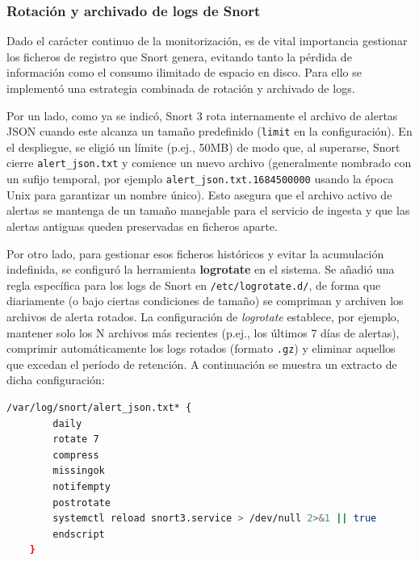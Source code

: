 \documentclass[11pt,a4paper,twoside]{report}
\begin{document}
\subsubsection{Rotación y archivado de logs de Snort}

Dado el carácter continuo de la monitorización, es de vital importancia gestionar los ficheros de registro que Snort genera, evitando tanto la pérdida de información como el consumo ilimitado de espacio en disco. Para ello se implementó una estrategia combinada de rotación y archivado de logs.\newline

Por un lado, como ya se indicó, Snort 3 rota internamente el archivo de alertas JSON cuando este alcanza un tamaño predefinido (\texttt{limit} en la configuración). En el despliegue, se eligió un límite (p.ej., 50MB) de modo que, al superarse, Snort cierre \texttt{alert\_json.txt} y comience un nuevo archivo (generalmente nombrado con un sufijo temporal, por ejemplo \texttt{alert\_json.txt.1684500000} usando la época Unix para garantizar un nombre único). Esto asegura que el archivo activo de alertas se mantenga de un tamaño manejable para el servicio de ingesta y que las alertas antiguas queden preservadas en ficheros aparte.\newline

Por otro lado, para gestionar esos ficheros históricos y evitar la acumulación indefinida, se configuró la herramienta \textbf{logrotate} en el sistema. Se añadió una regla específica para los logs de Snort en \texttt{/etc/logrotate.d/}, de forma que diariamente (o bajo ciertas condiciones de tamaño) se compriman y archiven los archivos de alerta rotados. La configuración de \textit{logrotate} establece, por ejemplo, mantener solo los N archivos más recientes (p.ej., los últimos 7 días de alertas), comprimir automáticamente los logs rotados (formato \texttt{.gz}) y eliminar aquellos que excedan el período de retención. A continuación se muestra un extracto de dicha configuración:

\begin{lstlisting}[language=bash, caption={Regla de logrotate para los logs de Snort}, label={lst:logrotate}]
	/var/log/snort/alert_json.txt* {
		daily
		rotate 7
		compress
		missingok
		notifempty
		postrotate
		systemctl reload snort3.service > /dev/null 2>&1 || true
		endscript
	}
\end{lstlisting}
\end{document}
